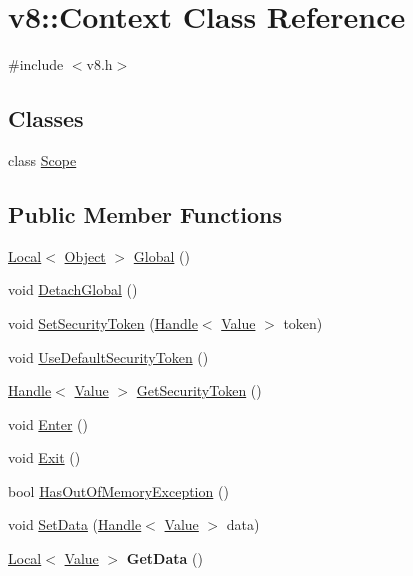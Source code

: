 \hypertarget{classv8_1_1_context}{}\section{v8\+:\+:Context Class Reference}
\label{classv8_1_1_context}


{\ttfamily \#include $<$v8.\+h$>$}

\subsection*{Classes}
\begin{DoxyCompactItemize}
\item 
class \hyperlink{classv8_1_1_context_1_1_scope}{Scope}
\end{DoxyCompactItemize}
\subsection*{Public Member Functions}
\begin{DoxyCompactItemize}
\item 
\hyperlink{classv8_1_1_local}{Local}$<$ \hyperlink{classv8_1_1_object}{Object} $>$ \hyperlink{classv8_1_1_context_af5cd9f97ef6a3307c1c21f80f4b743eb}{Global} ()
\item 
void \hyperlink{classv8_1_1_context_a841c7dd92eb8c57df92a268a164dea97}{Detach\+Global} ()
\item 
void \hyperlink{classv8_1_1_context_a288d8549547f6bdf4312f5333f60f24d}{Set\+Security\+Token} (\hyperlink{classv8_1_1_handle}{Handle}$<$ \hyperlink{classv8_1_1_value}{Value} $>$ token)
\item 
void \hyperlink{classv8_1_1_context_aa9e1a14982b64fd51ab87600a287bad2}{Use\+Default\+Security\+Token} ()
\item 
\hyperlink{classv8_1_1_handle}{Handle}$<$ \hyperlink{classv8_1_1_value}{Value} $>$ \hyperlink{classv8_1_1_context_a8e71e658633518ca7718c0f6e938c6a9}{Get\+Security\+Token} ()
\item 
void \hyperlink{classv8_1_1_context_a6995c49d9897eb49053f07874b825133}{Enter} ()
\item 
void \hyperlink{classv8_1_1_context_a2db09d4fefb26023a40d88972a4c1599}{Exit} ()
\item 
bool \hyperlink{classv8_1_1_context_aadec400a5da1e79e58a8770fd706b9a0}{Has\+Out\+Of\+Memory\+Exception} ()
\item 
void \hyperlink{classv8_1_1_context_a5121f42bf87ec10563e687761e750f53}{Set\+Data} (\hyperlink{classv8_1_1_handle}{Handle}$<$ \hyperlink{classv8_1_1_value}{Value} $>$ data)
\item 
\hypertarget{classv8_1_1_context_a0c5edad65549bf11edce29bfa3bc3aef}{}\hyperlink{classv8_1_1_local}{Local}$<$ \hyperlink{classv8_1_1_value}{Value} $>$ {\bfseries Get\+Data} ()\label{classv8_1_1_context_a0c5edad65549bf11edce29bfa3bc3aef}

\end{DoxyCompactItemize}
